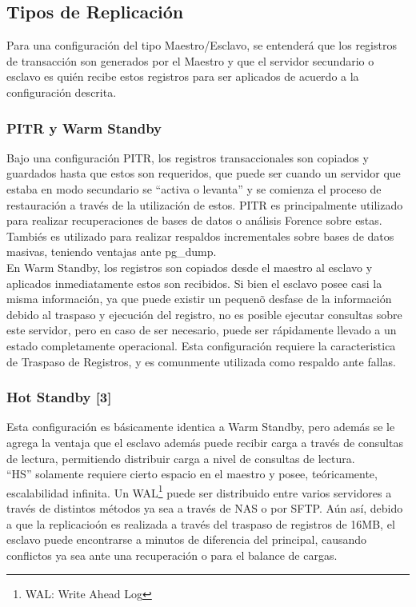 \documentclass[11pt]{article}
\begin{document}
\subsection{Tipos de Replicaci\'on}
Para una configuraci\'on del tipo Maestro/Esclavo, se entender\'a que los registros de transacci\'on son generados por el Maestro y que el servidor secundario o esclavo es qui\'en recibe estos registros para ser aplicados de acuerdo a la configuraci\'on descrita.\\

\subsubsection{PITR y Warm Standby}
Bajo una configuraci\'on PITR, los registros transaccionales son copiados y guardados hasta que estos son requeridos, que puede ser cuando un servidor que estaba en modo secundario se ``activa o levanta'' y se comienza el proceso de restauraci\'on a trav\'es de la utilizaci\'on de estos. PITR es principalmente utilizado para realizar recuperaciones de bases de datos o an\'alisis Forence sobre estas. Tambi\'es es utilizado para realizar respaldos incrementales sobre bases de datos
masivas, teniendo ventajas ante pg\_dump.\\

En Warm Standby, los registros son copiados desde el maestro al esclavo y aplicados inmediatamente estos son recibidos. Si bien el esclavo posee casi la misma informaci\'on, ya que puede existir un pequen\~o desfase de la informaci\'on debido al traspaso y  ejecuci\'on del registro, no es posible ejecutar consultas sobre este servidor, pero en caso de ser necesario, puede ser r\'apidamente llevado a un estado completamente operacional. Esta configuraci\'on requiere la caracteristica de
Traspaso de Registros, y es comunmente utilizada como respaldo ante fallas.\\

\subsubsection{Hot Standby [3]}
Esta configuraci\'on es b\'asicamente identica a Warm Standby, pero adem\'as se le agrega la ventaja que el esclavo adem\'as puede recibir carga a trav\'es de consultas de lectura, permitiendo distribuir carga a nivel de consultas de lectura.\\

``HS'' solamente requiere cierto espacio en el maestro y posee, te\'oricamente, escalabilidad infinita. Un WAL\footnote{WAL: Write Ahead Log} puede ser distribuido entre varios servidores a trav\'es de distintos m\'etodos ya sea a trav\'es de NAS o por SFTP. A\'un as\'i, debido a que la replicacio\'on es realizada a trav\'es del traspaso de registros de 16MB, el esclavo puede encontrarse a minutos de diferencia del principal, causando conflictos ya sea ante una recuperaci\'on o
para el balance de cargas.\\
\end{document}

